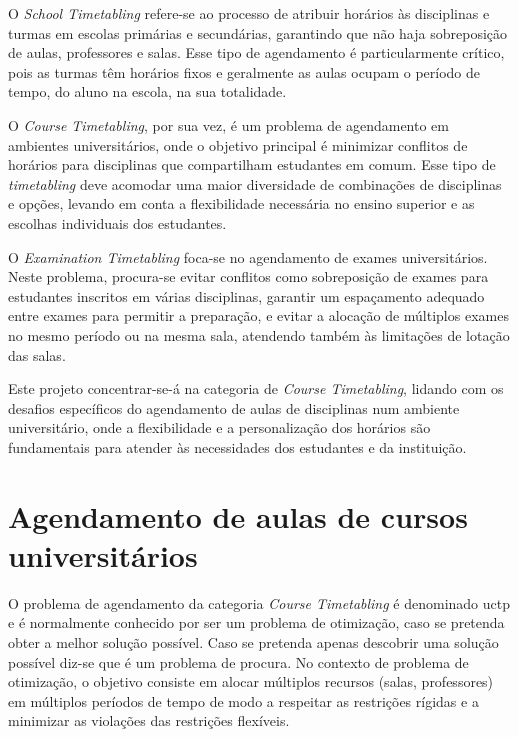 O \textit{School Timetabling} refere-se ao processo de atribuir horários às disciplinas e turmas em escolas primárias e secundárias, garantindo que não haja sobreposição de aulas, professores e salas. Esse tipo de agendamento é particularmente crítico, pois as turmas têm horários fixos e geralmente as aulas ocupam o período de tempo, do aluno na escola, na sua totalidade.

O \textit{Course Timetabling}, por sua vez, é um problema de agendamento em ambientes universitários, onde o objetivo principal é minimizar conflitos de horários para disciplinas que compartilham estudantes em comum. Esse tipo de \textit{timetabling} deve acomodar uma maior diversidade de combinações de disciplinas e opções, levando em conta a flexibilidade necessária no ensino superior e as escolhas individuais dos estudantes.

O \textit{Examination Timetabling} foca-se no agendamento de exames universitários. Neste problema, procura-se evitar conflitos como sobreposição de exames para estudantes inscritos em várias disciplinas, garantir um espaçamento adequado entre exames para permitir a preparação, e evitar a alocação de múltiplos exames no mesmo período ou na mesma sala, atendendo também às limitações de lotação das salas.

Este projeto concentrar-se-á na categoria de \textit{Course Timetabling}, lidando com os desafios específicos do agendamento de aulas de disciplinas num ambiente universitário, onde a flexibilidade e a personalização dos horários são fundamentais para atender às necessidades dos estudantes e da instituição.

\newpage %

\section{Agendamento de aulas de cursos universitários}
\label{capitulo2:Course-timetabling}

O problema de agendamento da categoria \textit{Course Timetabling} é denominado \gls{uctp} e é normalmente conhecido por ser um problema de otimização, caso se pretenda obter a melhor solução possível. Caso se pretenda apenas descobrir uma solução possível diz-se que é um problema de procura. No contexto de problema de otimização, o objetivo consiste em alocar múltiplos recursos (salas, professores) em múltiplos períodos de tempo de modo a respeitar as restrições rígidas e a minimizar as violações das restrições flexíveis.

